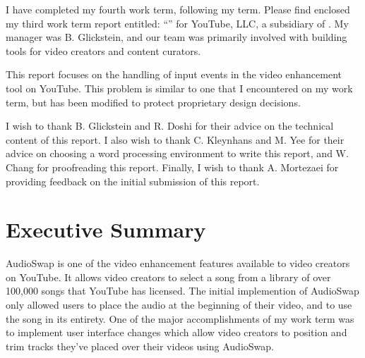 \documentclass[se,resubmit]{uw-wkrpt}
\begin{document}
\frontmatter

\begin{letter}
I have completed my fourth work term, following my \theterm{} term. Please find
enclosed my third work term report entitled: ``\thetitle'' for YouTube, LLC, a
subsidiary of \theemployer.  My manager was B. Glickstein, and our team was
primarily involved with building tools for video creators and content curators.

This report focuses on the handling of input events in the video
enhancement tool on YouTube. This problem is similar to one that I
encountered on my work term, but has been modified to protect proprietary
design decisions.

I wish to thank B. Glickstein and R. Doshi for their advice on the
technical content of this report. I also wish to thank C. Kleynhans and M.
Yee for their advice on choosing a word processing environment to write
this report, and W. Chang for proofreading this report. Finally, I
wish to thank A. Mortezaei for providing feedback on the initial
submission of this report.

\end{letter}

\section{Executive Summary}
AudioSwap is one of the video enhancement features available to video
creators on YouTube. It allows video creators to select a song from a
library of over 100,000 songs that YouTube has licensed. The initial
implemention of AudioSwap only allowed users to place the audio at the
beginning of their video, and to use the song in its entirety. One of the
major accomplishments of my work term was to implement user interface
changes which allow video creators to position and trim tracks they've
placed over their videos using AudioSwap.
\end{document}
